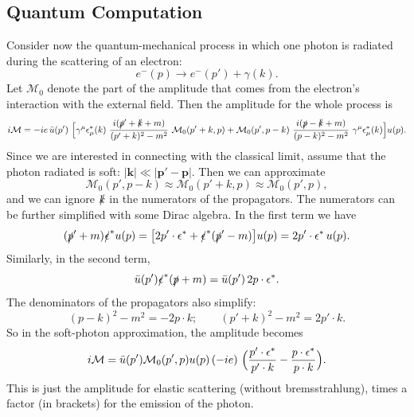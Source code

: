 \subsection{Quantum Computation}

Consider now the quantum-mechanical process in which one photon is radiated
during the scattering of an electron:
\begin{equation}
  e^{-}(p) \to e^{-}(p') + \gamma(k) .
\end{equation}
Let $\mathcal{M}_0$ denote the part of the amplitude that comes from the
electron's interaction with the external field.  Then the amplitude for the
whole process is
\begin{equation}
  i\mathcal{M} = -ie\,\bar{u}(p')\ \Bigl[
    \gamma^\mu\epsilon^{*}_\mu(k)\ \frac{i(\slashed{p}'+\slashed{k}+m)}
      {(p'+k)^2-m^2}\ \mathcal{M}_0(p'+k, p)
    + \mathcal{M}_0(p', p-k)\ \frac{i(\slashed{p}-\slashed{k}+m)}
      {(p-k)^2-m^2}\ \gamma^\mu\epsilon^{*}_\mu(k) \Bigr] u(p) .
  \label{eq:6.20}
\end{equation}
Since we are interested in connecting with the classical limit, assume that
the photon radiated is soft: $|\mathbf{k}| \ll |\mathbf{p}'-\mathbf{p}|$.
Then we can approximate
\begin{equation}
  \mathcal{M}_0(p', p-k) \approx \mathcal{M}_0(p'+k, p)
    \approx \mathcal{M}_0(p', p),
  \label{eq:6.21}
\end{equation}
and we can ignore $\slashed{k}$ in the numerators of the propagators.  The
numerators can be further simplified with some Dirac algebra.  In the first
term we have
\begin{equation}
  (\slashed{p}'+m)\slashed{\epsilon}^{*}u(p) = \bigl[
    2p'\cdot\epsilon^{*} + \slashed{\epsilon}^{*}(\slashed{p}'-m) \bigr]u(p)
    = 2p'\cdot\epsilon^{*}\, u(p) .
\end{equation}
Similarly, in the second term,
\begin{equation}
  \bar{u}(p')\slashed{\epsilon}^{*}(\slashed{p}+m) = \bar{u}(p')\,2p\cdot\epsilon^{*}.
\end{equation}
The denominators of the propagators also simplify:
\begin{equation}
  (p-k)^2 - m^2 = -2p\cdot k;\qquad
  (p'+k)^2 - m^2 = 2p'\cdot k .
\end{equation}
So in the soft-photon approximation, the amplitude becomes
\begin{equation}
  i\mathcal{M} = \bar{u}(p')\mathcal{M}_0(p',p)u(p)\,
    (-ie)\ \Bigl( \frac{p'\cdot\epsilon^{*}}{p'\cdot k}
      - \frac{p\cdot\epsilon^{*}}{p\cdot k} \Bigr).
  \label{eq:6.22}
\end{equation}
This is just the amplitude for elastic scattering (without bremsstrahlung),
times a factor (in brackets) for the emission of the photon.

